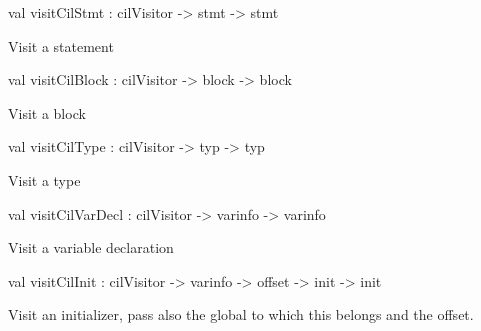 \documentclass[11pt]{article}
\begin{document}
\label{val:Cil.visitCilStmt}\begin{ocamldoccode}
val visitCilStmt : cilVisitor -> stmt -> stmt
\end{ocamldoccode}
\begin{ocamldocdescription}
Visit a statement


\end{ocamldocdescription}




\label{val:Cil.visitCilBlock}\begin{ocamldoccode}
val visitCilBlock : cilVisitor -> block -> block
\end{ocamldoccode}
\begin{ocamldocdescription}
Visit a block


\end{ocamldocdescription}




\label{val:Cil.visitCilType}\begin{ocamldoccode}
val visitCilType : cilVisitor -> typ -> typ
\end{ocamldoccode}
\begin{ocamldocdescription}
Visit a type


\end{ocamldocdescription}




\label{val:Cil.visitCilVarDecl}\begin{ocamldoccode}
val visitCilVarDecl : cilVisitor -> varinfo -> varinfo
\end{ocamldoccode}
\begin{ocamldocdescription}
Visit a variable declaration


\end{ocamldocdescription}




\label{val:Cil.visitCilInit}\begin{ocamldoccode}
val visitCilInit : cilVisitor -> varinfo -> offset -> init -> init
\end{ocamldoccode}
\begin{ocamldocdescription}
Visit an initializer, pass also the global to which this belongs and the 
 offset.


\end{ocamldocdescription}
\end{document}
